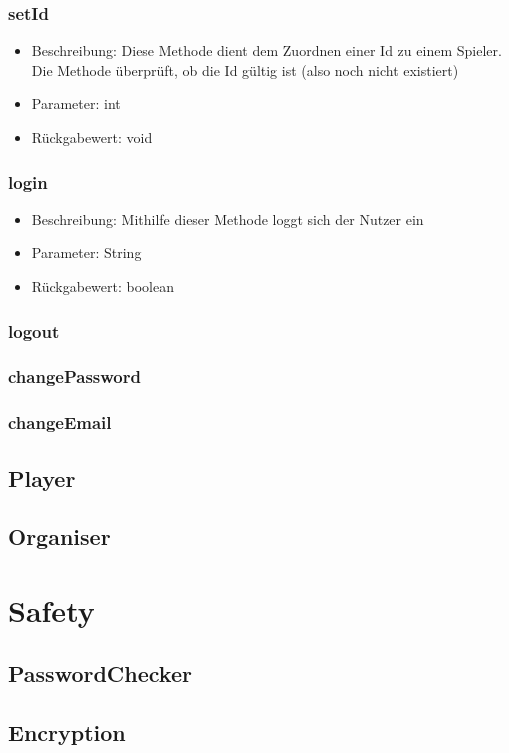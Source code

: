 \documentclass[a4paper]{scrreprt}
\begin{document}
	\subsubsection{setId}
	\begin{itemize}
		\item Beschreibung: Diese Methode dient dem Zuordnen einer Id zu einem Spieler. Die Methode überprüft, ob die Id gültig ist (also noch nicht existiert)
		\item Parameter: int
		\item Rückgabewert: void
	\end{itemize}
	\subsubsection{login}
	\begin{itemize}
		\item Beschreibung: Mithilfe dieser Methode loggt sich der Nutzer ein
		\item Parameter: String
		\item Rückgabewert: boolean
	\end{itemize}
	\subsubsection{logout}
	\subsubsection{changePassword}
	\subsubsection{changeEmail}
	
	\subsection{Player}
	\subsection{Organiser}
	
	\section{Safety}
	\subsection{PasswordChecker}
	\subsection{Encryption}
	
\end{document}
